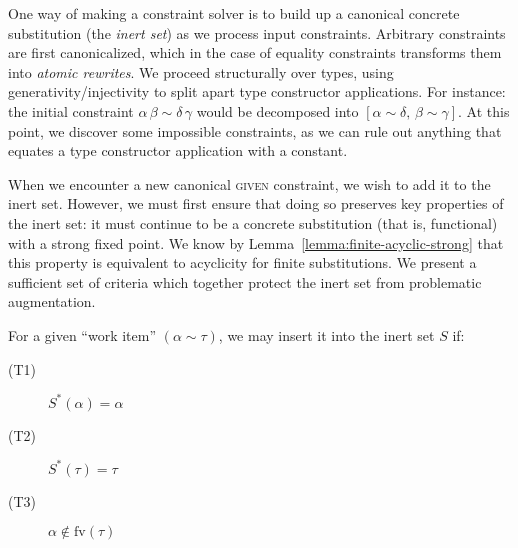 \documentclass[10pt, letterpaper, oneside]{article}
\newcommand{\fv}{\mathrm{fv}}
\begin{document}
One way of making a constraint solver is to build up a canonical concrete substitution (the \emph{inert set}) as we process input constraints. Arbitrary constraints are first canonicalized, which in the case of equality constraints transforms them into \emph{atomic rewrites}. We proceed structurally over types, using generativity/injectivity to split apart type constructor applications. For instance: the initial constraint \(\alpha\, \beta \sim \delta\, \gamma\) would be decomposed into \([\alpha \sim \delta,\, \beta \sim \gamma]\). At this point, we discover some impossible constraints, as we can rule out anything that equates a type constructor application with a constant.

When we encounter a new canonical \textsc{given} constraint, we wish to add it to the inert set. However, we must first ensure that doing so preserves key properties of the inert set: it must continue to be a concrete substitution (that is, functional) with a strong fixed point. We know by Lemma~\ref{lemma:finite-acyclic-strong} that this property is equivalent to acyclicity for finite substitutions. We present a sufficient set of criteria which together protect the inert set from problematic augmentation.






For a given ``work item'' \((\alpha \sim \tau)\), we may insert it into the inert set \(S\) if:

\begin{description}
\item[(T1)] \(S^\ast(\alpha) = \alpha\)
\item[(T2)] \(S^\ast(\tau) = \tau\)
\item[(T3)] \(\alpha \notin \fv(\tau)\)
\end{description}
\end{document}
